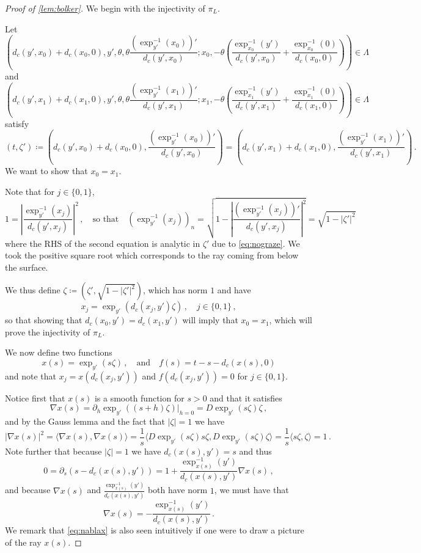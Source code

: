 \documentclass[
	fontsize=11pt, 
	twoside=false, 
	abstract=true, 
	a4paper,
]{scrartcl}
\newcommand{\abs}[1]{\left\lvert#1\right\rvert}
\newcommand{\del}{\partial}
\newcommand{\an}{\quad\text{and}\quad}
\begin{document}
\begin{proof}[Proof of \cref{lem:bolker}]
	We begin with the injectivity of $\pi_L$. 

	Let
	\[
		\left(d_c(y',x_0)+d_c(x_0,0),y',\theta,\theta \frac{(\exp_{y'}^{-1}(x_0))'}{d_c(y',x_0)};x_0,-\theta \left(\frac{\exp_{x_0}^{-1}(y')}{d_c(y',x_0)}+\frac{\exp_{x_0}^{-1}(0)}{d_c(x_0,0)}\right)\right) \in \Lambda
	\]
	and
	\[
		 \left(d_c(y',x_1)+d_c(x_1,0),y',\theta,\theta \frac{(\exp_{y'}^{-1}(x_1))'}{d_c(y',x_1)};x_1,-\theta \left(\frac{\exp_{x_1}^{-1}(y')}{d_c(y',x_1)}+\frac{\exp_{x_1}^{-1}(0)}{d_c(x_1,0)}\right)\right) \in \Lambda
	\]
	satisfy
	\[
		(t,\zeta') \coloneqq \left(d_c(y',x_0)+d_c(x_0,0),\frac{(\exp_{y'}^{-1}(x_0))'}{d_c(y',x_0)}\right) = \left(d_c(y',x_1)+d_c(x_1,0),\frac{(\exp_{y'}^{-1}(x_1))'}{d_c(y',x_1)}\right)\,.
	\]
	We want to show that $x_0 = x_1$. 

	Note that for $j\in\{0,1\}$,
	\[
		1= \abs{\frac{\exp_{y'}^{-1}(x_j)}{d_c(y',x_j)}}^2\,,\quad \text{so that}\quad (\exp_{y'}^{-1}(x_j))_n = \sqrt{1 - \abs{\frac{(\exp_{y'}^{-1}(x_j))'}{d_c(y',x_j)}}^2} = \sqrt{1-\abs{\zeta'}^2}
	\]
	where the RHS of the second equation is analytic in $\zeta'$ due to \cref{eq:nograze}. We took the positive square root which corresponds to the ray coming from below the surface.

	We thus define $\zeta \coloneqq \left(\zeta', \sqrt{1-\abs{\zeta'}^2}\right)$, which has norm $1$ and have
	\[
		x_j = \exp_{y'}\left(d_c(x_j,y') \zeta\right)\,,\quad j\in\{0,1\}\,,%
	\]
	so that showing that $d_c(x_0,y')=d_c(x_1,y')$ will imply that $x_0 = x_1$, which will prove the injectivity of $\pi_L$.

	We now define two functions
	\[
		x(s) = \exp_{y'}(s\zeta)\,,\an f(s) = t-s-d_c(x(s),0)
	\]
	and note that $x_j = x(d_c(x_j,y'))$ and $f(d_c(x_j,y')) = 0$ for $j\in\{0,1\}$. 

	Notice first that $x(s)$ is a smooth function for $s>0$ and that it satisfies
	\[
		\nabla x(s) = \del_h \exp_{y'}((s+h)\zeta)\vert_{h=0} = D\exp_{y'}(s\zeta)\zeta\,,	
	\]
	and by the Gauss lemma \cite[Thm.~6.2]{ilmavirta2020geometry} and the fact that $\abs{\zeta}=1$ we have
	\[
		\abs{\nabla x(s)}^2 = \langle \nabla x(s),\nabla x(s)\rangle = \frac{1}{s}\langle D\exp_{y'}(s\zeta)s \zeta,D\exp_{y'}(s\zeta)\zeta\rangle = \frac{1}{s} \langle s\zeta, \zeta\rangle = 1\,.
	\]
	Note further that because $\abs{\zeta}=1$ we have $d_c(x(s),y')=s$ and thus 
	\[
		0 = \del_s(s-d_c(x(s),y')) = 1+\frac{\exp_{x(s)}^{-1}(y')}{d_c(x(s),y')}\nabla x(s)\,,
	\]
	and because $\nabla x(s)$ and $\frac{\exp_{x(s)}^{-1}(y')}{d_c(x(s),y')}$ both have norm $1$, we must have that
	\begin{equation}\label{eq:nablax}
		\nabla x(s) = - \frac{\exp_{x(s)}^{-1}(y')}{d_c(x(s),y')}\,.
	\end{equation}
	We remark that \cref{eq:nablax} is also seen intuitively if one were to draw a picture of the ray $x(s)$. 


\end{proof}
\end{document}
